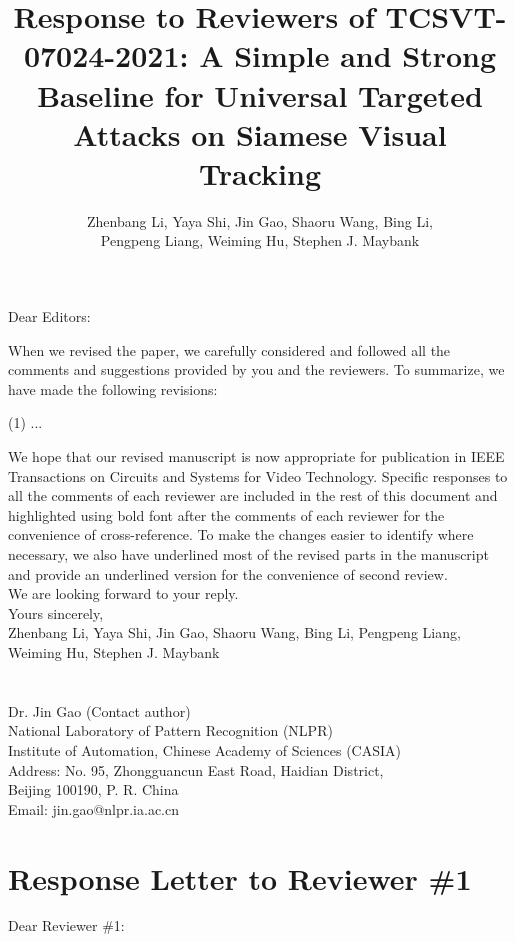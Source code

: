 \documentclass[12pt]{article}
\begin{document}
\linespread{1}
\title{Response to Reviewers of TCSVT-07024-2021: A Simple and Strong Baseline for Universal Targeted Attacks on Siamese Visual Tracking}
\author{Zhenbang Li, Yaya Shi, Jin Gao, Shaoru Wang, Bing Li,\\ Pengpeng Liang, Weiming Hu, Stephen J. Maybank}
\date{}
\maketitle

\noindent Dear Editors:

When we revised the paper, we carefully considered and followed all the comments and suggestions provided by you and the reviewers. To summarize, we have made the following revisions:

(1) ...

We hope that our revised manuscript is now appropriate for publication in IEEE Transactions on Circuits and Systems for Video Technology. Specific responses to all the comments of each reviewer are included in the rest of this document and highlighted using bold font after the comments of each reviewer for the convenience of cross-reference. To make the changes easier to identify where necessary, we also have underlined most of the revised parts in the manuscript and provide an underlined version for the convenience of second review.\\[10pt]
\indent We are looking forward to your reply.\\[10pt]
\noindent Yours sincerely,\\
\noindent Zhenbang Li, Yaya Shi, Jin Gao, Shaoru Wang, Bing Li, Pengpeng Liang, Weiming Hu, Stephen J. Maybank
\\
\\
\\
\noindent Dr. Jin Gao (Contact author)\\
\noindent National Laboratory of Pattern Recognition (NLPR)\\
\noindent Institute of Automation, Chinese Academy of Sciences (CASIA)\\
\noindent Address: No. 95, Zhongguancun East Road, Haidian District,\\
\noindent Beijing 100190, P. R. China\\
\noindent Email: jin.gao@nlpr.ia.ac.cn

\newpage
{\centering\section*{Response Letter to Reviewer \#1}}
\noindent Dear Reviewer \#1:
\end{document}
